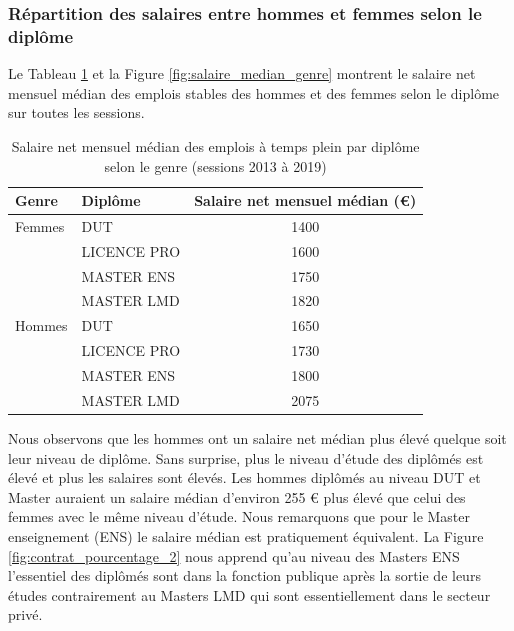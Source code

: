 \documentclass[12pt, a4paper, titlepage, table]{article}
\begin{document}
	\subsubsection{Répartition des salaires entre hommes et femmes selon le diplôme}
	Le Tableau \ref{tab:salaire_median_genre} et la Figure \ref{fig:salaire_median_genre} montrent le salaire net mensuel médian des emplois stables des hommes et des femmes selon le diplôme sur toutes les sessions. 
	
	\begin{table}[H]
		\centering
		\begin{tabular}{llc}
			\toprule
			\textbf{Genre} & \textbf{Diplôme} & \textbf{Salaire net mensuel médian (€)} \\
			\midrule
			Femmes & DUT & 1400 \\
			& LICENCE PRO & 1600 \\
			& MASTER ENS & 1750 \\
			& MASTER LMD & 1820 \\
			\midrule
			Hommes & DUT & 1650 \\
			& LICENCE PRO & 1730 \\
			& MASTER ENS & 1800 \\
			& MASTER LMD & 2075 \\
			\bottomrule
		\end{tabular}
		\caption{Salaire net mensuel médian des emplois à temps plein par diplôme selon le genre (sessions 2013 à 2019)}
		\label{tab:salaire_median_genre}
	\end{table}
	
	
	
	Nous observons que les hommes ont un salaire net médian plus élevé quelque soit leur niveau de diplôme.
	Sans surprise, plus le niveau d'étude des diplômés est élevé et plus les salaires sont élevés.
	Les hommes diplômés au niveau DUT et Master auraient un salaire médian d'environ 255 € plus élevé que celui des femmes avec le même niveau d'étude.
	Nous remarquons que pour le Master enseignement (ENS) le salaire médian est pratiquement équivalent.  
	La Figure \ref{fig:contrat_pourcentage_2} nous apprend qu'au niveau des Masters ENS l'essentiel des diplômés sont dans la fonction publique après la sortie de leurs études contrairement au Masters LMD qui sont essentiellement dans le secteur privé.
		
\end{document}
